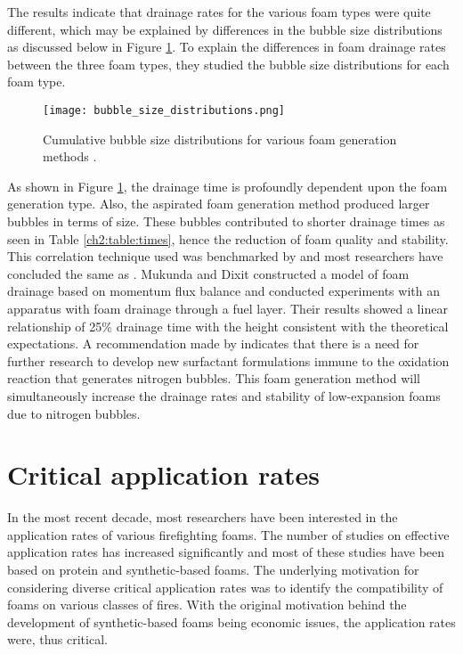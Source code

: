 The results indicate that drainage rates for the various foam types were quite different, which may be explained by differences in the bubble size distributions as discussed below in Figure \ref{ch2:figure:distributions}. To explain the differences in foam drainage rates between the three foam types, they studied the bubble size distributions for each foam type.

\begin{figure}[H]
    \centering
    \texttt{[image: bubble\_size\_distributions.png]}
    \caption{Cumulative bubble size distributions for various foam generation methods \cite{laundess2012suppression}.}
    \label{ch2:figure:distributions}
\end{figure}

As shown in Figure \ref{ch2:figure:distributions}, the drainage time is profoundly dependent upon the foam generation type. Also, the aspirated foam generation method produced larger bubbles in terms of size. These bubbles contributed to shorter drainage times as seen in Table \ref{ch2:table:times}, hence the reduction of foam quality and stability. This correlation technique used was benchmarked by \cite{oguike2013study} and most researchers have concluded the same as \cite{laundess2012suppression}. Mukunda and Dixit \cite{csb2016phenomenological} constructed a model of foam drainage based on momentum flux balance and conducted experiments with an apparatus with foam drainage through a fuel layer. Their results showed a linear relationship of 25\% drainage time with the height consistent with the theoretical expectations. A recommendation made by \cite{laundess2012suppression} indicates that there is a need for further research to develop new surfactant formulations immune to the oxidation reaction that generates nitrogen bubbles. This foam generation method will simultaneously increase the drainage rates and stability of low-expansion foams due to nitrogen bubbles. 

\section{Critical application rates}
In the most recent decade, most researchers have been interested in the application rates of various firefighting foams. The number of studies on effective application rates has increased significantly and most of these studies have been based on protein and synthetic-based foams. The underlying motivation for considering diverse critical application rates was to identify the compatibility of foams on various classes of fires. With the original motivation behind the development of synthetic-based foams being economic issues, the application rates were, thus critical.

